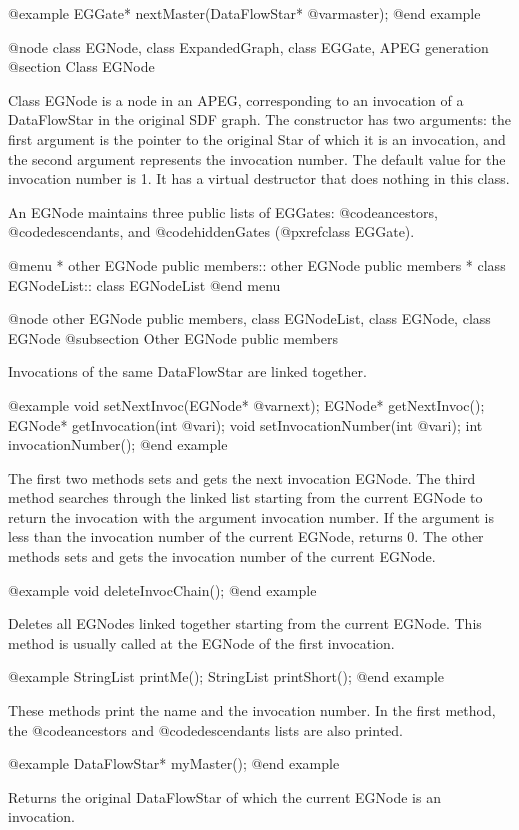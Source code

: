 @example
EGGate* nextMaster(DataFlowStar* @var{master});
@end example

@node class EGNode, class ExpandedGraph, class EGGate, APEG generation
@section Class EGNode

Class EGNode is a node in an APEG, corresponding to an invocation of a
DataFlowStar in the original SDF graph. The constructor has two arguments:
the first argument is the pointer to the original Star of which it is an
invocation, and the second argument represents the invocation number.
The default value for the invocation number is 1. It has a virtual
destructor that does nothing in this class.

An EGNode maintains three public lists of EGGates: @code{ancestors},
@code{descendants}, and @code{hiddenGates} (@pxref{class EGGate}).

@menu
* other EGNode public members::		other EGNode public members
* class EGNodeList::			class EGNodeList
@end menu

@node other EGNode public members, class EGNodeList, class EGNode, class EGNode
@subsection Other EGNode public members

Invocations of the same DataFlowStar are linked together.

@example
void setNextInvoc(EGNode* @var{next});
EGNode* getNextInvoc();
EGNode* getInvocation(int @var{i});
void setInvocationNumber(int @var{i});
int invocationNumber();
@end example

The first two methods sets and gets the next invocation EGNode. The third
method searches through the linked list starting from the current EGNode
to return the invocation with the argument invocation number. If the
argument is less than the invocation number of the current EGNode, returns 0.
The other methods sets and gets the invocation number of the current EGNode.

@example
void deleteInvocChain();
@end example

Deletes all EGNodes linked together starting from the current EGNode.
This method is usually called at the EGNode of the first invocation. 

@example
StringList printMe();
StringList printShort();
@end example

These methods print the name and the invocation number. In the first method,
the @code{ancestors} and @code{descendants} lists are also printed.

@example
DataFlowStar* myMaster();
@end example

Returns the original DataFlowStar of which the current EGNode is an
invocation.

